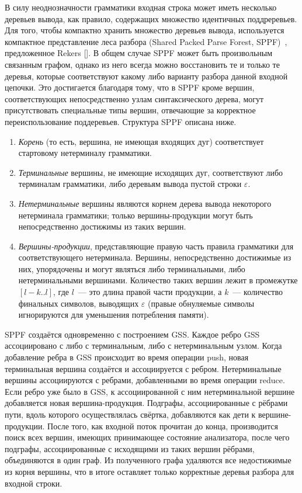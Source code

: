 В силу неоднозначности грамматики входная строка может иметь несколько деревьев вывода, как правило, содержащих множество идентичных поддреревьев. Для того, чтобы компактно хранить множество деревьев вывода, 
используется компактное представление леса разбора (Shared Packed Parse Forest, SPPF)~\cite{SPPF}, предложенное Rekers []. В общем случае SPPF может быть произвольным связанным графом, однако из него всегда можно 
восстановить те и только те деревья, которые соответствуют какому либо варианту разбора данной входной цепочки. Это достигается благодаря тому, что в SPPF кроме вершин, соответствующих 
непосредственно узлам синтаксического дерева, могут присутствовать специальные типы вершин, отвечающие за корректное переиспользование поддеревьев. Структура SPPF описана ниже.
\begin{enumerate}
  \item \emph{Корень} (то есть, вершина, не имеющая входящих дуг) соответствует стартовому нетерминалу грамматики.
  \item \emph{Терминальные} вершины, не имеющие исходящих дуг, соответствуют либо терминалам грамматики, либо деревьям вывода пустой строки $\varepsilon$.
  \item \emph{Нетерминальные} вершины являются корнем дерева вывода некоторого нетерминала грамматики; только вершины-продукции могут быть непосредственно достижимы из таких вершин.
  \item \emph{Вершины-продукции}, представляющие правую часть правила грамматики для соответствующего нетерминала. Вершины, непосредственно достижимые из них, упорядочены и могут являться либо терминальными, либо нетерминальными вершинами. Количество таких вершин лежит в промежутке $[l-k..l]$, где $l$~--- это длина правой части продукции, а $k$~--- количество финальных символов, выводящих $\varepsilon$ (правые обнуляемые символы игнорируются для уменьшения потребления памяти).
\end{enumerate}

SPPF создаётся одновременно с построением GSS. Каждое ребро GSS ассоциировано с либо с терминальным, либо с нетерминальным узлом. Когда добавление ребра в GSS происходит во время операции push, новая терминальная вершина создаётся и ассоциируется с ребром. Нетерминальные вершины ассоциируются с ребрами, добавленными во время операции reduce. Если ребро уже было в GSS, к ассоциированной с ним нетерминальной вершине добавляется новая вершина-продукция. Подграфы, ассоциированные с рёбрами пути, вдоль которого осуществлялась свёртка, добавляются как дети к вершине-продукции. После того, как входной поток прочитан до конца, производится поиск всех вершин, имеющих принимающее состояние анализатора, после чего подграфы, ассоциированные с исходящими из таких вершин рёбрами, объединяются в один граф. Из полученного графа удаляются все недостижимые из корня вершины, что в итоге оставляет только корректные деревья разбора для входной строки. 


